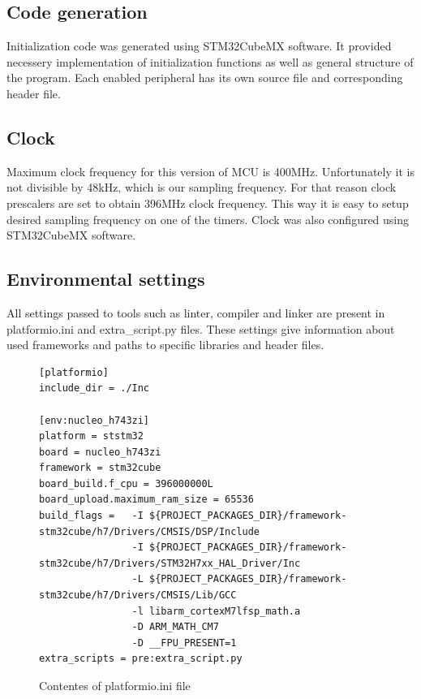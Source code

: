 \documentclass[a4paper,twoside,12pt]{book}
\begin{document}
\subsection{Code generation}

Initialization code was generated using STM32CubeMX software.
It provided necessery implementation of initialization functions
as well as general structure of the program.
Each enabled peripheral has its own source file
and corresponding header file.

\subsection{Clock}

Maximum clock frequency for this version of MCU is 400MHz.
Unfortunately it is not divisible by 48kHz, which is our sampling frequency.
For that reason clock prescalers are set to obtain 396MHz clock frequency.
This way it is easy to setup desired sampling frequency on one of the timers.
Clock was also configured using STM32CubeMX software.

\subsection{Environmental settings}

All settings passed to tools such as linter, compiler and linker
are present in platformio.ini and extra\_script.py files.
These settings give information about used frameworks
and paths to specific libraries and header files.

\begin{figure}[H]
\centering
\begin{lstlisting}
[platformio]
include_dir = ./Inc

[env:nucleo_h743zi]
platform = ststm32
board = nucleo_h743zi
framework = stm32cube
board_build.f_cpu = 396000000L
board_upload.maximum_ram_size = 65536
build_flags =   -I ${PROJECT_PACKAGES_DIR}/framework-stm32cube/h7/Drivers/CMSIS/DSP/Include
                -I ${PROJECT_PACKAGES_DIR}/framework-stm32cube/h7/Drivers/STM32H7xx_HAL_Driver/Inc
                -L ${PROJECT_PACKAGES_DIR}/framework-stm32cube/h7/Drivers/CMSIS/Lib/GCC
                -l libarm_cortexM7lfsp_math.a
                -D ARM_MATH_CM7
                -D __FPU_PRESENT=1
extra_scripts = pre:extra_script.py
\end{lstlisting}
\caption{Contentes of platformio.ini file}
\label{fig:ini}
\end{figure}
\end{document}
